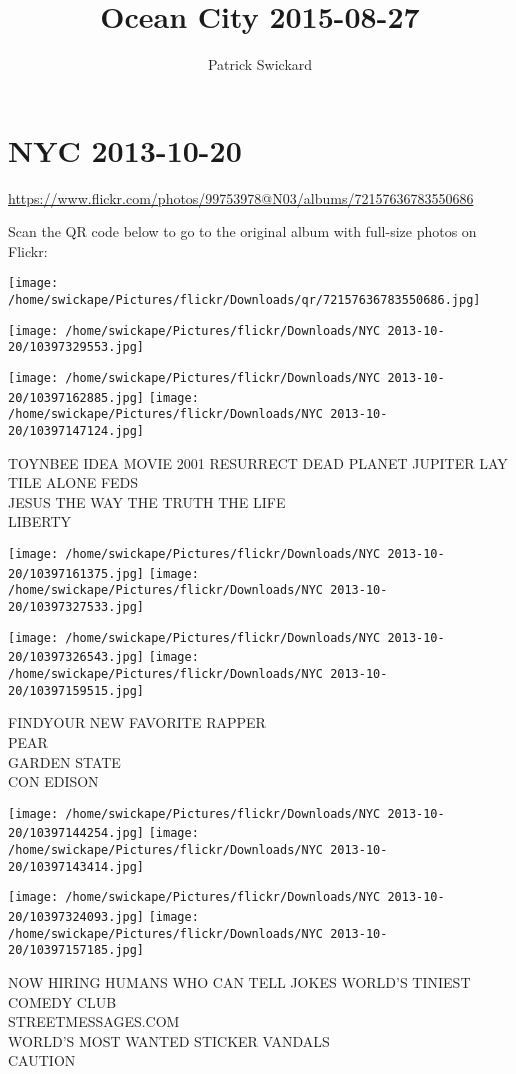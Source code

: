 \documentclass[10pt,letterpaper]{article}
\title{Ocean City 2015-08-27}
\author{Patrick Swickard}
\date{}
\begin{document}
\section*{NYC 2013-10-20}

\url{https://www.flickr.com/photos/99753978@N03/albums/72157636783550686}

Scan the QR code below to go to the original album with full-size photos on Flickr:

\texttt{[image: /home/swickape/Pictures/flickr/Downloads/qr/72157636783550686.jpg]}
\pagebreak

\texttt{[image: /home/swickape/Pictures/flickr/Downloads/NYC 2013-10-20/10397329553.jpg]}

\vspace{0.25in}
\texttt{[image: /home/swickape/Pictures/flickr/Downloads/NYC 2013-10-20/10397162885.jpg]}
\texttt{[image: /home/swickape/Pictures/flickr/Downloads/NYC 2013-10-20/10397147124.jpg]}

TOYNBEE IDEA MOVIE 2001 RESURRECT DEAD PLANET JUPITER LAY TILE ALONE FEDS\\
JESUS THE WAY THE TRUTH THE LIFE\\
LIBERTY
\pagebreak

\texttt{[image: /home/swickape/Pictures/flickr/Downloads/NYC 2013-10-20/10397161375.jpg]}
\texttt{[image: /home/swickape/Pictures/flickr/Downloads/NYC 2013-10-20/10397327533.jpg]}

\texttt{[image: /home/swickape/Pictures/flickr/Downloads/NYC 2013-10-20/10397326543.jpg]}
\texttt{[image: /home/swickape/Pictures/flickr/Downloads/NYC 2013-10-20/10397159515.jpg]}

FINDYOUR NEW FAVORITE RAPPER\\
PEAR\\
GARDEN STATE\\
CON EDISON
\pagebreak

\texttt{[image: /home/swickape/Pictures/flickr/Downloads/NYC 2013-10-20/10397144254.jpg]}
\texttt{[image: /home/swickape/Pictures/flickr/Downloads/NYC 2013-10-20/10397143414.jpg]}

\texttt{[image: /home/swickape/Pictures/flickr/Downloads/NYC 2013-10-20/10397324093.jpg]}
\texttt{[image: /home/swickape/Pictures/flickr/Downloads/NYC 2013-10-20/10397157185.jpg]}

NOW HIRING HUMANS WHO CAN TELL JOKES WORLD'S TINIEST COMEDY CLUB\\
STREETMESSAGES.COM\\
WORLD'S MOST WANTED STICKER VANDALS\\
CAUTION
\pagebreak
\end{document}
